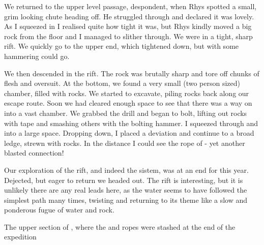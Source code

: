 We returned to the upper level passage, despondent, when Rhys spotted a small, grim looking chute heading off. He struggled through and declared it was lovely. As I squeezed in I realised quite how tight it was, but Rhys kindly moved a big rock from the floor and I managed to slither through. We were in a tight, sharp rift. We quickly go to the upper end, which tightened down, but with some hammering could go. 
 
We then descended in the rift. The rock was brutally sharp and tore off chunks of flesh and oversuit. At the bottom, we found a very small (two person sized) chamber, filled with rocks. We started to excavate, piling rocks back along our escape route. Soon we had cleared enough space to see that there was a way on into a vast chamber. We grabbed the drill and began to bolt, lifting out rocks with tape and smashing others with the bolting hammer. I squeezed through and into a large space. Dropping down, I placed a deviation and continue to a broad ledge, strewn with rocks. In the distance I could see the rope of  - yet another blasted connection!
 
Our exploration of the rift, and indeed the sistem, was at an end for this year. Dejected, but eager to return we headed out. The rift is interesting, but it is unlikely there are any real leads here, as the water seems to have followed the simplest path many times, twisting and returning to its theme like a slow and ponderous fugue of water and rock.



\begin{pagefigure}
\checkoddpage \ifoddpage \forcerectofloat \else \forceversofloat \fi
\centering
{}
\caption{The upper section of \protect{}, where the \protect{} and \protect{} ropes were stashed at the end of the expedition }
\label{fig:colony}
\end{pagefigure}
